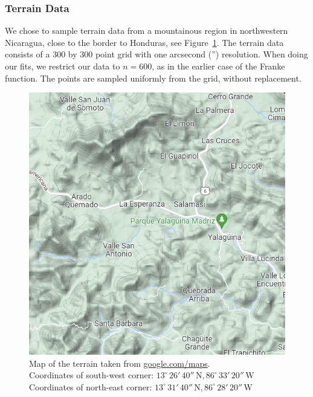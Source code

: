 \documentclass[twocolumn,english,notitlepage]{article}
\begin{document}
        \subsubsection{Terrain Data}
            We chose to sample terrain data from a mountainous region in northwestern Nicaragua, close to the border to Honduras, see Figure~\ref{met:fig:gmaps}.
            The terrain data consists of a 300 by 300 point grid with one arcsecond ('') resolution. When doing our fits, we restrict our data to $n=600$, as in the earlier case of the Franke function. The points are sampled uniformly from the grid, without replacement. 
            \begin{figure} [ht]
                \centering
                \includegraphics[width=.9\linewidth]{Nica_gmaps.PNG}
                \caption{Map of the terrain taken from \url{google.com/maps}. \\
                Coordinates of south-west corner: $13^\circ\,26'\,40''\,\text{N}, 86^\circ\,33'\,20''\,\text{W}$ \\
                Coordinates of north-east corner: $13^\circ\,31'\,40''\,\text{N}, 86^\circ\,28'\,20''\,\text{W}$}
                \label{met:fig:gmaps}
            \end{figure}
            
\end{document}

